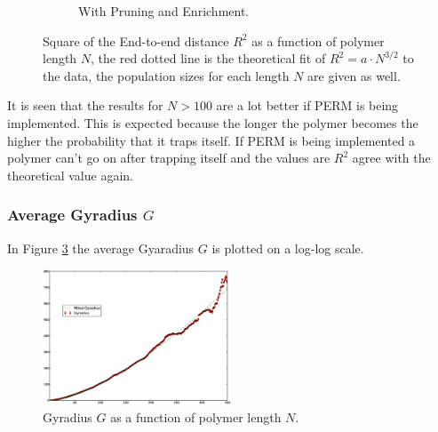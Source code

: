 \begin{figure}[htb]
\begin{subfigure}[b]{0.45\textwidth}
                \caption{With Pruning and Enrichment.}
                \label{fig:etoe_prem}
        \end{subfigure}
        \caption{Square of the End-to-end distance $R^2$ as a function of polymer length $N$, the red dotted line is the theoretical fit of $R^2=a\cdot N^{3/2}$ to the data, the population sizes for each length $N$ are given as well.}
        \label{fig:etoe}
\end{figure}

It is seen that the results for $N>100$ are a lot better if PERM is being implemented. This is expected because the longer the polymer becomes the higher the probability that it traps itself. If PERM is being implemented a polymer can't go on after trapping itself and the values are $R^2$ agree with the theoretical value again. 


\subsubsection*{Average Gyradius $G$}

In Figure \ref{fig:gyradius} the average Gyaradius $G$ is plotted on a log-log scale.


\begin{figure}[ht!]
\centering
\includegraphics[width=0.5\textwidth]{figures/N350_Gyradius_PERM1}
\caption{Gyradius $G$ as a function of polymer length $N$.}
\label{fig:gyradius}
\end{figure}